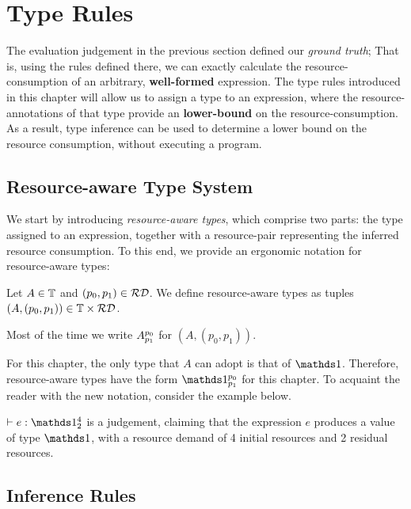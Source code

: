 \section{Type Rules}
The evaluation judgement in the previous section defined our \emph{ground truth}; That is, using the rules defined there, we can exactly calculate the resource-consumption of an arbitrary, \textbf{well-formed} expression. The type rules introduced in this chapter will allow us to assign a type to an expression, where the resource-annotations of that type provide an \textbf{lower-bound} on the resource-consumption. As a result, type inference can be used to determine a lower bound on the resource consumption, without executing a program.

\subsection{Resource-aware Type System}

We start by introducing \emph{resource-aware types}, which comprise two parts: the type assigned to an expression, together with a resource-pair representing the inferred resource consumption. To this end, we provide an ergonomic notation for resource-aware types:

\begin{definition}\label{def:ra-type}
   Let \(A \in \mathbb{T}\) and \((p_0, p_1) \in \mathcal{RD}\). We define resource-aware types as tuples \((A, (p_0, p_1)) \in \mathbb{T} \times \mathcal{RD}\).
\end{definition}

\begin{remark}
   Most of the time we write \(A ^{p_0}_{p_1}\) for \((A, (p_0, p_1))\).
\end{remark}

For this chapter, the only type that \(A\) can adopt is that of \(\unit\). Therefore, resource-aware types have the form \(\ratype{\unit}{p_0}{p_1}\) for this chapter. To acquaint the reader with the new notation, consider the example below.

\begin{example}
   \(\typing{}{e}{\ratype{\unit}{4}{2}}\) is a judgement, claiming that the expression \(e\) produces a value of type \(\unit\), with a resource demand of 4 initial resources and 2 residual resources.
\end{example}

\subsection{Inference Rules}

